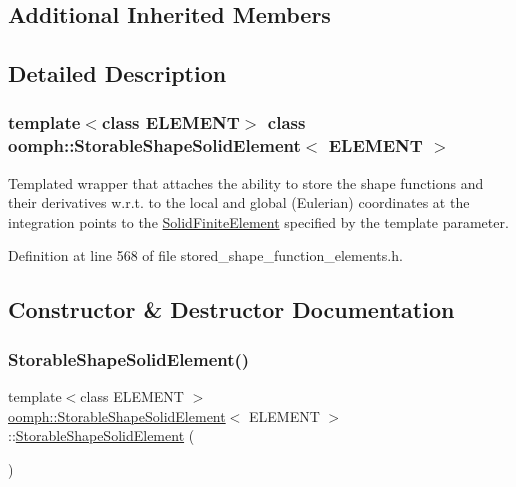 \subsection*{Additional Inherited Members}


\subsection{Detailed Description}
\subsubsection*{template$<$class E\+L\+E\+M\+E\+NT$>$\newline
class oomph\+::\+Storable\+Shape\+Solid\+Element$<$ E\+L\+E\+M\+E\+N\+T $>$}

Templated wrapper that attaches the ability to store the shape functions and their derivatives w.\+r.\+t. to the local and global (Eulerian) coordinates at the integration points to the \hyperlink{classoomph_1_1SolidFiniteElement}{Solid\+Finite\+Element} specified by the template parameter. 

Definition at line 568 of file stored\+\_\+shape\+\_\+function\+\_\+elements.\+h.



\subsection{Constructor \& Destructor Documentation}
\mbox{\label{classoomph_1_1StorableShapeSolidElement_a8f5bbc17bdcf01df0f9d924a67c0139d}} 
\subsubsection{\texorpdfstring{Storable\+Shape\+Solid\+Element()}{StorableShapeSolidElement()}\hspace{0.1cm}{\footnotesize\ttfamily [1/2]}}
{\footnotesize\ttfamily template$<$class E\+L\+E\+M\+E\+NT $>$ \\
\hyperlink{classoomph_1_1StorableShapeSolidElement}{oomph\+::\+Storable\+Shape\+Solid\+Element}$<$ E\+L\+E\+M\+E\+NT $>$\+::\hyperlink{classoomph_1_1StorableShapeSolidElement}{Storable\+Shape\+Solid\+Element} (\begin{DoxyParamCaption}{ }\end{DoxyParamCaption})\hspace{0.3cm}{\ttfamily [inline]}}



